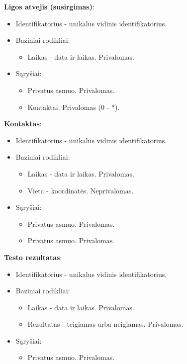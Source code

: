 \documentclass{VUMIFPSkursinis}
\begin{document}
\noindent\textbf{Ligos atvejis (susirgimas)}:
\begin{itemize}
	\item Identifikatorius - unikalus vidinis identifikatorius.
	\item Baziniai rodikliai:
	\begin{itemize}
		\item Laikas - data ir laikas. Privalomas.
	\end{itemize}
	\item Sąryšiai:
	\begin{itemize}
		\item Privatus asmuo. Privalomas.
		\item Kontaktai. Privalomas (0 - *).
	\end{itemize}	
\end{itemize}

\noindent\textbf{Kontaktas}:
\begin{itemize}
	\item Identifikatorius - unikalus vidinis identifikatorius.
	\item Baziniai rodikliai:
	\begin{itemize}
		\item Laikas - data ir laikas. Privalomas.
		\item Vieta - koordinatės. Neprivalomas.
	\end{itemize}
	\item Sąryšiai:
	\begin{itemize}
		\item Privatus asmuo. Privalomas.
		\item Privatus asmuo. Privalomas.
	\end{itemize}	
\end{itemize}

\noindent\textbf{Testo rezultatas}:
\begin{itemize}
	\item Identifikatorius - unikalus vidinis identifikatorius.
	\item Baziniai rodikliai:
	\begin{itemize}
		\item Laikas - data ir laikas. Privalomas.
		\item Rezultatas - teigiamas arba neigiamas. Privalomas.
	\end{itemize}
	\item Sąryšiai:
	\begin{itemize}
		\item Privatus asmuo. Privalomas.
	\end{itemize}	
\end{itemize}
\end{document}
